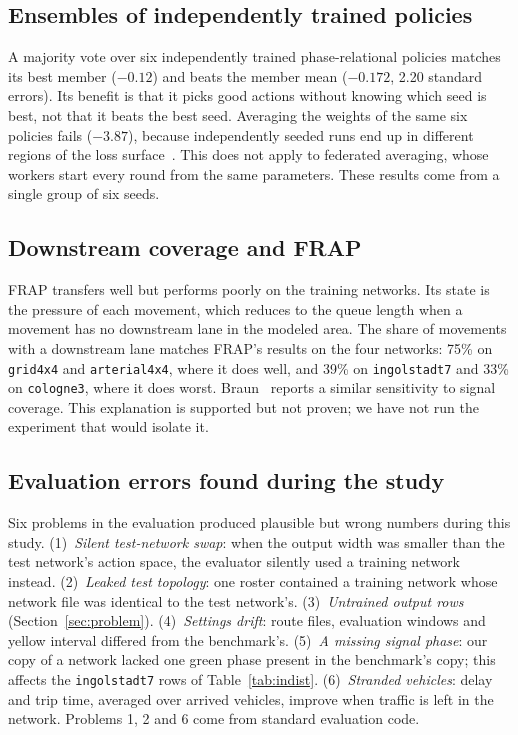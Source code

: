 \documentclass[conference]{IEEEtran}
\begin{document}
\subsection{Ensembles of independently trained policies}
A majority vote over six independently trained phase-relational policies matches its best
member ($-0.12$) and beats the member mean ($-0.172$, 2.20 standard errors). Its benefit is
that it picks good actions without knowing which seed is best, not that it beats the best
seed. Averaging the weights of the same six policies fails ($-3.87$), because independently
seeded runs end up in different regions of the loss surface~\cite{permsym}. This does not
apply to federated averaging, whose workers start every round from the same parameters.
These results come from a single group of six seeds.

\subsection{Downstream coverage and FRAP}\label{sec:frapcov}
FRAP transfers well but performs poorly on the training networks. Its state is the pressure
of each movement, which reduces to the queue length when a movement has no downstream lane
in the modeled area. The share of movements with a downstream lane matches FRAP's results
on the four networks: 75\% on \texttt{grid4x4} and \texttt{arterial4x4}, where it does well,
and 39\% on \texttt{ingolstadt7} and 33\% on \texttt{cologne3}, where it does worst.
Braun~\cite{graphiface} reports a similar sensitivity to signal coverage. This explanation
is supported but not proven; we have not run the experiment that would isolate it.

\subsection{Evaluation errors found during the study}\label{sec:artifacts}
Six problems in the evaluation produced plausible but wrong numbers during this study.
(1)~\emph{Silent test-network swap}: when the output width was smaller than the test
network's action space, the evaluator silently used a training network instead.
(2)~\emph{Leaked test topology}: one roster contained a training network whose network
file was identical to the test network's. (3)~\emph{Untrained output rows}
(Section~\ref{sec:problem}). (4)~\emph{Settings drift}: route files, evaluation windows and
yellow interval differed from the benchmark's. (5)~\emph{A missing signal phase}: our copy
of a network lacked one green phase present in the benchmark's copy; this affects the
\texttt{ingolstadt7} rows of Table~\ref{tab:indist}. (6)~\emph{Stranded vehicles}: delay and
trip time, averaged over arrived vehicles, improve when traffic is left in the network.
Problems 1, 2 and 6 come from standard evaluation code.
\end{document}
